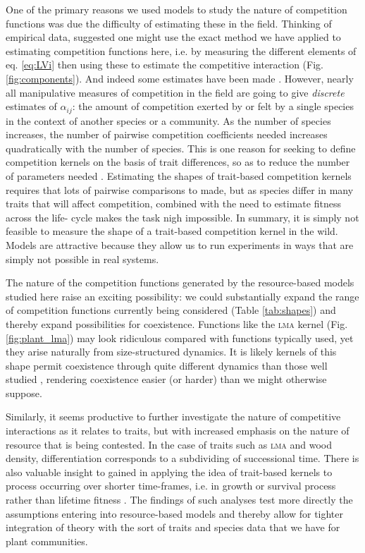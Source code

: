\documentclass[a4paper,11pt]{article}
\begin{document}
One of the primary reasons we used models to study the nature of
competition functions was due the difficulty of estimating these in
the field.
Thinking of empirical data, \citet{Ricklefs-1973} suggested one might use
the exact method we have
applied to estimating competition functions here, i.e. by measuring the
different elements of eq. \ref{eq:LVi} then using these to estimate
the competitive interaction (Fig. \ref{fig:components}).
And indeed some estimates have been made \citep{Ricklefs-1973,
  Kraft-2015}.
%
However, nearly all manipulative measures of competition in the field
are going to give \emph{discrete} estimates of $\alpha_{ij}$: the
amount of competition exerted by or felt by a single species in the
context of another species or a community. As the number of species
increases, the number of pairwise competition coefficients needed
increases quadratically with the number of species. This is one reason
for seeking to define competition kernels on the basis of trait
differences, so as to reduce the number of parameters needed
\citep{Kraft-2015}. Estimating the shapes of trait-based competition
kernels requires that lots of pairwise comparisons to made, but as
species differ in many traits that will affect competition, combined
with the need to estimate fitness across the life- cycle makes the
task nigh impossible. In summary, it is simply not feasible to measure the
shape of a trait-based competition kernel in the wild. 
Models are attractive because they allow us to
run experiments in ways that are simply not possible in real systems.

The nature of the competition functions generated by the
resource-based models studied here raise an exciting possibility: we
could substantially expand the range of competition functions
currently being considered (Table \ref{tab:shapes}) and thereby expand
possibilities for coexistence. Functions like the \textsc {lma} kernel
(Fig. \ref{fig:plant_lma}) may look ridiculous compared with functions
typically used, yet they arise naturally from size-structured
dynamics.  It is likely kernels of this shape permit coexistence
through quite different dynamics than those well studied
\citep[e.g.][]{Leimar-2013}, rendering coexistence easier (or harder)
than we might otherwise suppose.

Similarly, it seems productive to further investigate the nature of
competitive interactions as it relates to traits, but with increased
emphasis on the nature of resource that is being contested. In the
case of traits such as \textsc{lma} and wood density, differentiation
corresponds to a subdividing of successional time. There is also
valuable insight to gained in applying the idea of trait-based kernels
to process occurring over shorter time-frames, i.e. in growth or
survival process rather than lifetime fitness
\citep[e.g.][]{Kunstler-2012, Lasky-2015}.  The findings of such
analyses test more directly the assumptions entering into
resource-based models and thereby allow for tighter integration of
theory with the sort of traits and species data that we have for plant
communities.
\end{document}
